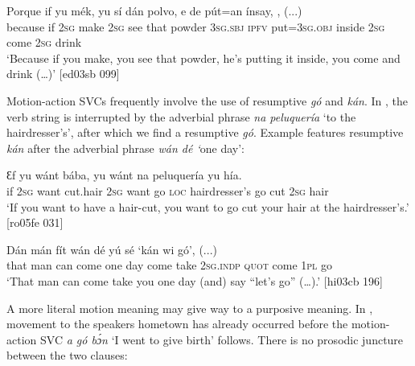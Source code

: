 \ea%
    \label{ex:key:1555}
    \gll Porque  if  yu  mék,  yu  sí  dán  polvo,  e    de
pút=an    ínsay,          ,  (...)\\
because  if  \textsc{2sg}  make  \textsc{2sg}  see  that  powder  \textsc{3sg.sbj}  \textsc{ipfv}
put=\textsc{3sg.obj}  inside  \textsc{2sg}  come  \textsc{2sg}  drink\\

\glt ‘Because if you make, you see that powder, he’s putting it inside, 
you come and drink (…)’ [ed03sb 099]
\z

Motion-action SVCs frequently involve the use of resumptive \textit{gó} and \textit{kán}. In , the verb string is interrupted by the adverbial phrase \textit{na peluquería} ‘to the hairdresser’s’, after which we find a resumptive \textit{gó}. Example  features resumptive \textit{kán} after the adverbial phrase \textit{wán dé ‘}one day’: 


\ea%
    \label{ex:key:1556}
    \gll Ɛf  yu  wánt bába,  yu  wánt    na  peluquería      yu  hía.\\
if  \textsc{2sg}  want  cut.hair  \textsc{2sg}  want  go  \textsc{loc}  hairdresser’s  go  cut  \textsc{2sg}  hair\\

\glt ‘If you want to have a hair-cut, you want to go cut your hair at the hairdresser’s.’
[ro05fe 031]
\z


\ea%
    \label{ex:key:1557}
    \gll Dán  mán    fít      wán  dé          yú    sé   
 ‘kán  wi  gó’,  (...)\\
that  man    can  come  one  day  come  take    \textsc{2sg.indp}  \textsc{quot}     
  come  \textsc{1pl}  go\\

\glt ‘That man can come take you one day (and) say “let’s go” (…).’ [hi03cb 196]
\z

A more literal motion meaning may give way to a purposive meaning. In , movement to the speakers hometown has already occurred before the motion-action SVC \textit{a gó bɔ́n} ‘I went to give birth’ follows. There is no prosodic juncture between the two clauses:


